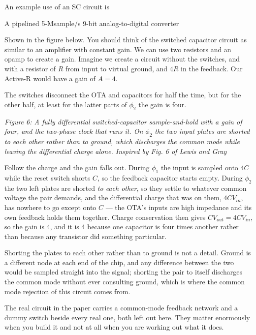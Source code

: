 An example use of an SC circuit is

A pipelined 5-Msample/s 9-bit analog-to-digital converter

Shown in the figure below. You should think of the switched capacitor
circuit as similar to an amplifier with constant gain. We can use two
resistors and an opamp to create a gain. Imagine we create a circuit
without the switches, and with a resistor of \(R\) from input to virtual
ground, and \(4R\) in the feedback. Our Active-R would have a gain of
\(A = 4\).

The switches disconnect the OTA and capacitors for half the time, but
for the other half, at least for the latter parts of \(\phi_2\) the gain
is four.


{
\centering
{}
}

\emph{Figure 6: A fully differential switched-capacitor sample-and-hold
with a gain of four, and the two-phase clock that runs it. On \(\phi_2\)
the two input plates are shorted to each other rather than to ground,
which discharges the common mode while leaving the differential charge
alone. Inspired by Fig. 6 of Lewis and Gray
}

Follow the charge and the gain falls out. During \(\phi_1\) the input is
sampled onto \(4C\) while the reset switch shorts \(C\), so the feedback
capacitor starts empty. During \(\phi_2\) the two left plates are
shorted \emph{to each other}, so they settle to whatever common voltage
the pair demands, and the differential charge that was on them,
\(4C V_{in}\), has nowhere to go except onto \(C\) --- the OTA's inputs
are high impedance and its own feedback holds them together. Charge
conservation then gives \(C
V_{out} = 4C V_{in}\), so the gain is 4, and it is 4 because one
capacitor is four times another rather than because any transistor did
something particular.

Shorting the plates to each other rather than to ground is not a detail.
Ground is a different node at each end of the chip, and any difference
between the two would be sampled straight into the signal; shorting the
pair to itself discharges the common mode without ever consulting
ground, which is where the common mode rejection of this circuit comes
from.

The real circuit in the paper carries a common-mode feedback network and
a dummy switch beside every real one, both left out here. They matter
enormously when you build it and not at all when you are working out
what it does.

